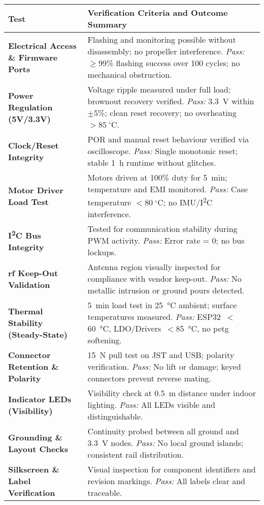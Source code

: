 \begin{longtable}{@{}p{4.2cm} p{11cm}@{}}
\toprule
\textbf{Test} & \textbf{Verification Criteria and Outcome Summary} \\ 
\midrule
\textbf{Electrical Access \& Firmware Ports} &
Flashing and monitoring possible without disassembly; no propeller interference. \newline
\textit{Pass:} $\geq$99\% flashing success over 100 cycles; no mechanical obstruction. \\ 
\midrule
\textbf{Power Regulation (5V/3.3V)} &
Voltage ripple measured under full load; brownout recovery verified. \newline
\textit{Pass:} 3.3~V within $\pm$5\%; clean reset recovery; no overheating $>85~^{\circ}$C. \\ 
\midrule
\textbf{Clock/Reset Integrity} &
POR and manual reset behaviour verified via oscilloscope. \newline
\textit{Pass:} Single monotonic reset; stable 1~h runtime without glitches. \\ 
\midrule
\textbf{Motor Driver Load Test} &
Motors driven at 100\% duty for 5~min; temperature and EMI monitored. \newline
\textit{Pass:} Case temperature $<80~^{\circ}$C; no IMU/I\textsuperscript{2}C interference. \\ 
\midrule
\textbf{I\textsuperscript{2}C Bus Integrity} &
Tested for communication stability during PWM activity. \newline
\textit{Pass:} Error rate = 0; no bus lockups. \\ 
\midrule
\textbf{\gls{rf} Keep-Out Validation} &
Antenna region visually inspected for compliance with vendor keep-out. \newline
\textit{Pass:} No metallic intrusion or ground pours detected. \\ 
\midrule
\textbf{Thermal Stability (Steady-State)} &
5~min load test in 25~°C ambient; surface temperatures measured. \newline
\textit{Pass:} ESP32~$<$60~°C, LDO/Drivers~$<$85~°C, no \gls{petg} softening. \\ 
\midrule
\textbf{Connector Retention \& Polarity} &
15~N pull test on JST and USB; polarity verification. \newline
\textit{Pass:} No lift or damage; keyed connectors prevent reverse mating. \\ 
\midrule
\textbf{Indicator LEDs (Visibility)} &
Visibility check at 0.5~m distance under indoor lighting. \newline
\textit{Pass:} All LEDs visible and distinguishable. \\ 
\midrule
\textbf{Grounding \& Layout Checks} &
Continuity probed between all ground and 3.3~V nodes. \newline
\textit{Pass:} No local ground islands; consistent rail distribution. \\ 
\midrule
\textbf{Silkscreen \& Label Verification} &
Visual inspection for component identifiers and revision markings. \newline
\textit{Pass:} All labels clear and traceable. \\ 
\bottomrule
\end{longtable}

